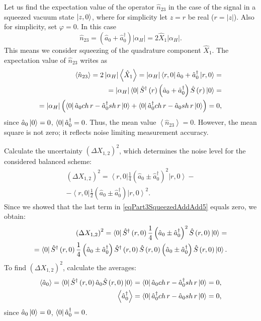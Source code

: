 Let us find the expectation value of the operator $\hat{n}_{23}$ in the case of the signal in
a squeezed vacuum state $\ket{z, 0}$, where for simplicity
let $z = r$ be real ($r = \left|z\right|$). Also for simplicity, set $\varphi = 0$. In this case
\[
\hat{n}_{23} =
\left(\hat{a}_0 + \hat{a}_0^{\dag}\right) \left|\alpha_H\right| = 
2 \hat{X}_1 \left|\alpha_H\right|.
\]
This means we consider squeezing of the quadrature
component $\hat{X}_1$. The expectation value of $\hat{n}_{23}$
writes as
\begin{eqnarray}
\left<\hat{n}_{23}\right> = 
2 \left|\alpha_H\right|\left<\hat{X}_1\right> = 
\left|\alpha_H\right|\bra{r, 0}\hat{a}_0 +
\hat{a}_0^{\dag}\ket{r, 0} =
\nonumber \\
=
\left|\alpha_H\right|\bra{0}
\hat{S}^{\dag}\left(r\right)
\left(\hat{a}_0 +
\hat{a}_0^{\dag}\right)
\hat{S}\left(r\right)
\ket{0} =
\nonumber \\
=
\left|\alpha_H\right|
\left(
\bra{0}
\hat{a}_0 ch\,r -
\hat{a}_0^{\dag} sh\,r
\ket{0} 
+
\bra{0}
\hat{a}_0^{\dag} ch\,r -
\hat{a}_0 sh\,r
\ket{0} 
\right)
= 0,
\nonumber
\end{eqnarray}
since $\hat{a}_0\ket{0} = 0$, 
$\bra{0}\hat{a}_0^{\dag} = 0$.
Thus, the mean value $\left<\hat{n}_{23}\right> =
0$. However, the mean square is not zero; it reflects noise limiting
measurement accuracy.

Calculate the uncertainty $\left(\Delta X_{1,2}\right)^2$, which
determines the noise level for the considered balanced scheme:
\begin{eqnarray}
\left(\Delta X_{1,2}\right)^2 = 
\left<r,
0\right|\frac{1}{4}\left(\hat{a}_0\pm\hat{a}_0^{\dag}\right)^2\left|r,
0\right> -
\nonumber \\
-
\left<r,
0\right|\frac{1}{2}\left(\hat{a}_0\pm\hat{a}_0^{\dag}\right)\left|r,
0\right>^2.
\label{eqPart3SqueezedAddAdd5}
\end{eqnarray}
Since we showed that the last term in
\eqref{eqPart3SqueezedAddAdd5} equals zero, we obtain:
\begin{eqnarray}
\left(\Delta X_{1,2}\right)^2 = 
\bra{0}\hat{S}^{\dag}\left(r, 0\right)
\frac{1}{4}\left(\hat{a}_0\pm\hat{a}_0^{\dag}\right)^2
\hat{S}\left(r, 0\right)
\ket{0} = 
\nonumber \\
=
\bra{0}\hat{S}^{\dag}\left(r, 0\right)
\frac{1}{4}
\left(\hat{a}_0\pm\hat{a}_0^{\dag}\right)
\hat{S}^{\dag}\left(r, 0\right)
\hat{S}\left(r, 0\right)
\left(\hat{a}_0\pm\hat{a}_0^{\dag}\right)
\hat{S}\left(r, 0\right)
\ket{0}.
\label{eqPart3SqueezedAddAdd6}
\end{eqnarray}
To find 
$\left(\Delta X_{1,2}\right)^2$, calculate the averages:
\begin{eqnarray}
\left<\hat{a}_0\right> = 
\bra{0}
\hat{S}^{\dag}\left(r, 0\right)
\hat{a}_0
\hat{S}\left(r, 0\right)
\ket{0} = 
\bra{0}
\hat{a}_0 ch\,r - \hat{a}_0^{\dag} sh\,r
\ket{0} = 0,
\nonumber \\
\left<\hat{a}_0^{\dag}\right> = 
\bra{0}
\hat{a}_0^{\dag} ch\,r - \hat{a}_0 sh\,r
\ket{0} = 0,
\label{eqPart3SqueezedAddAdd7}
\end{eqnarray}
since $\hat{a}_0\ket{0} = 0$, 
$\bra{0}\hat{a}_0^{\dag} = 0$.

